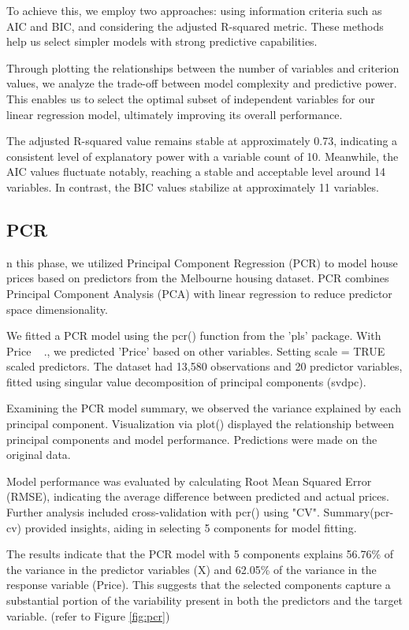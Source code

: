 \documentclass[12pt,doublespace]{article}
\begin{document}
	To achieve this, we employ two approaches: using information criteria such as AIC and BIC, and considering the adjusted R-squared metric. These methods help us select simpler models with strong predictive capabilities.
	
	Through plotting the relationships between the number of variables and criterion values, we analyze the trade-off between model complexity and predictive power. This enables us to select the optimal subset of independent variables for our linear regression model, ultimately improving its overall performance.
	
	The adjusted R-squared value remains stable at approximately 0.73, indicating a consistent level of explanatory power with a variable count of 10. Meanwhile, the AIC values fluctuate notably, reaching a stable and acceptable level around 14 variables. In contrast, the BIC values stabilize at approximately 11 variables.
			
	\subsection{PCR}
	n this phase, we utilized Principal Component Regression (PCR) to model house prices based on predictors from the Melbourne housing dataset. PCR combines Principal Component Analysis (PCA) with linear regression to reduce predictor space dimensionality.
	
	We fitted a PCR model using the pcr() function from the 'pls' package. With Price ~ ., we predicted 'Price' based on other variables. Setting scale = TRUE scaled predictors. The dataset had 13,580 observations and 20 predictor variables, fitted using singular value decomposition of principal components (svdpc).
	
	Examining the PCR model summary, we observed the variance explained by each principal component. Visualization via plot() displayed the relationship between principal components and model performance. Predictions were made on the original data.
	
	Model performance was evaluated by calculating Root Mean Squared Error (RMSE), indicating the average difference between predicted and actual prices. Further analysis included cross-validation with pcr() using "CV". Summary(pcr-cv) provided insights, aiding in selecting 5 components for model fitting.
	
	The results indicate that the PCR model with 5 components explains 56.76\% of the variance in the predictor variables (X) and 62.05\% of the variance in the response variable (Price). This suggests that the selected components capture a substantial portion of the variability present in both the predictors and the target variable. (refer to Figure \ref{fig:pcr})
	
\end{document}
